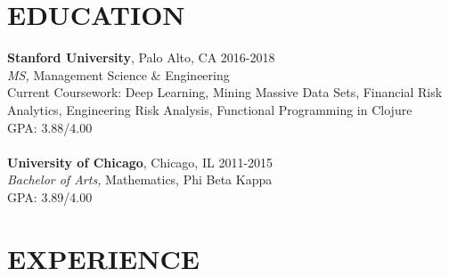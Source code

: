 \documentclass[margin, 10pt]{res} %
\begin{document}
\begin{resume}

% 
%


\section{EDUCATION}

\textbf{Stanford University}, Palo Alto, CA \hfill 2016-2018 \\
{\sl MS,} Management Science \& Engineering \\
Current Coursework: Deep Learning, Mining Massive Data Sets, Financial Risk Analytics, Engineering Risk Analysis, Functional Programming in Clojure \\
GPA: 3.88/4.00 \\\\
\textbf{University of Chicago}, Chicago, IL \hfill 2011-2015 \\
{\sl Bachelor of Arts,} Mathematics, Phi Beta Kappa \\
GPA: 3.89/4.00
 
 
\section{EXPERIENCE}


\end{resume}
\end{document}
